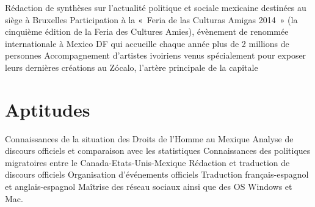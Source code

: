 \documentclass[30pt, french]{tccv}
\begin{document}
\begin{upshape}
\begin{experience}
    \setlength{\parskip}{-10pt}
    \begin{itemize}
      \cvitem[\checkmark] Rédaction de synthèses sur l’actualité politique et sociale mexicaine destinées au siège à Bruxelles
      \cvitem[\checkmark] Participation à la « Feria de las Culturas Amigas 2014 » (la cinquième édition de la Feria des Cultures Amies), évènement de renommée internationale à Mexico DF qui accueille chaque année plus de 2 millions de personnes 
      \cvitem[\checkmark] Accompagnement d’artistes ivoiriens venus spécialement pour exposer leurs dernières créations au Zócalo, l’artère principale de la capitale
    \end{itemize}     




\section{Aptitudes}
\setlength{\parskip}{0pt}
\begin{itemize}[leftmargin=13pt]
  \cvitem[\checkmark]  Connaissances de la situation des Droits de l’Homme au Mexique
  \cvitem[\checkmark]  Analyse de discours officiels et comparaison avec les statistiques
  \cvitem[\checkmark]  Connaissances des politiques migratoires entre le Canada-Etats-Unis-Mexique
  \cvitem[\checkmark]  Rédaction et traduction de discours officiels
  \cvitem[\checkmark]  Organisation d’événements officiels
  \cvitem[\checkmark]  Traduction français-espagnol et anglais-espagnol
  \cvitem[\checkmark]  Maîtrise des réseau sociaux ainsi que des OS Windows et Mac. 
\end{itemize}
\end{experience}





\end{upshape}
\end{document}
